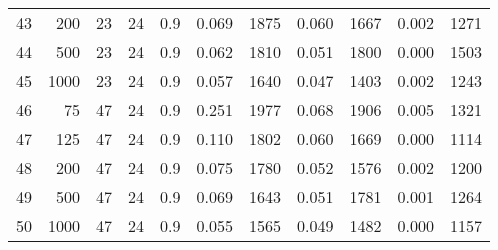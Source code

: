 \documentclass{article}
\begin{document}
\begin{tabular}{rrrrrrrrrrr}
  43 & 200 & 23 & 24 & 0.9 & 0.069 & 1875 & 0.060 & 1667 & 0.002 & 1271 \\ 
  44 & 500 & 23 & 24 & 0.9 & 0.062 & 1810 & 0.051 & 1800 & 0.000 & 1503 \\ 
  45 & 1000 & 23 & 24 & 0.9 & 0.057 & 1640 & 0.047 & 1403 & 0.002 & 1243 \\ 
   \hline
46 & 75 & 47 & 24 & 0.9 & 0.251 & 1977 & 0.068 & 1906 & 0.005 & 1321 \\ 
  47 & 125 & 47 & 24 & 0.9 & 0.110 & 1802 & 0.060 & 1669 & 0.000 & 1114 \\ 
  48 & 200 & 47 & 24 & 0.9 & 0.075 & 1780 & 0.052 & 1576 & 0.002 & 1200 \\ 
  49 & 500 & 47 & 24 & 0.9 & 0.069 & 1643 & 0.051 & 1781 & 0.001 & 1264 \\ 
  50 & 1000 & 47 & 24 & 0.9 & 0.055 & 1565 & 0.049 & 1482 & 0.000 & 1157 \\ 
   \hline
\end{tabular}
\end{document}
